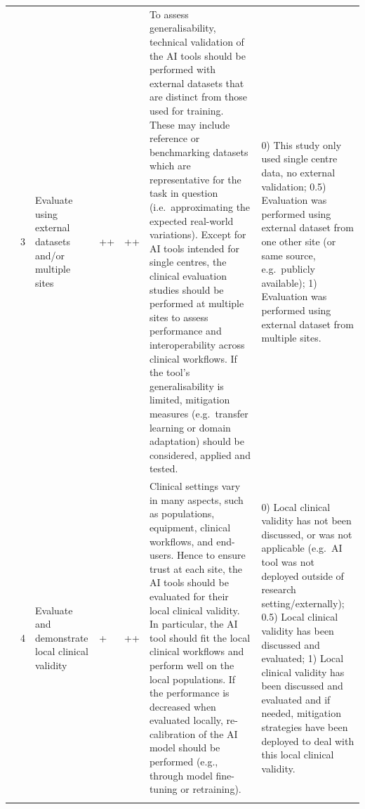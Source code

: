 \begin{landscape}
\begin{longtable}{@{}p{0.9cm}p{0.5cm}p{2.8cm}p{0.6cm}p{0.6cm}p{7.2cm}p{5.5cm}@{}}
	& 3 & Evaluate using external datasets and/or multiple sites & ++ & ++ & To assess generalisability, technical validation of the AI tools should be performed with external datasets that are distinct from those used for training. These may include reference or benchmarking datasets which are representative for the task in question (i.e.\ approximating the expected real-world variations). Except for AI tools intended for single centres, the clinical evaluation studies should be performed at multiple sites to assess performance and interoperability across clinical workflows. If the tool's generalisability is limited, mitigation measures (e.g.\ transfer learning or domain adaptation) should be considered, applied and tested. & 0) This study only used single centre data, no external validation; 0.5) Evaluation was performed using external dataset from one other site (or same source, e.g.\ publicly available); 1) Evaluation was performed using external dataset from multiple sites. \\
	\addlinespace
	& 4 & Evaluate and demonstrate local clinical validity & + & ++ & Clinical settings vary in many aspects, such as populations, equipment, clinical workflows, and end-users. Hence to ensure trust at each site, the AI tools should be evaluated for their local clinical validity. In particular, the AI tool should fit the local clinical workflows and perform well on the local populations. If the performance is decreased when evaluated locally, re-calibration of the AI model should be performed (e.g., through model fine-tuning or retraining). & 0) Local clinical validity has not been discussed, or was not applicable (e.g.\ AI tool was not deployed outside of research setting/externally); 0.5) Local clinical validity has been discussed and evaluated; 1) Local clinical validity has been discussed and evaluated and if needed, mitigation strategies have been deployed to deal with this local clinical validity. \\
	\addlinespace

\end{longtable}
\end{landscape}
